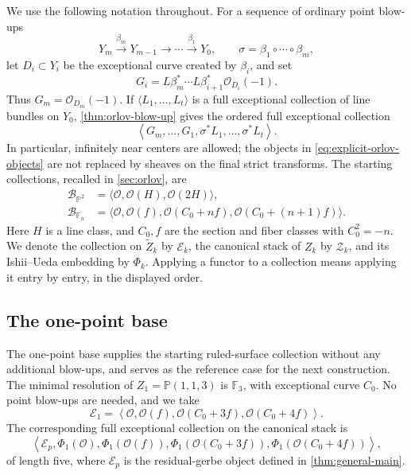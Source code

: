 \documentclass[11pt]{article}
\theoremstyle{plain}
\theoremstyle{definition}
\theoremstyle{remark}
\newcommand{\Pp}{\mathbb P}
\newcommand{\F}{\mathbb F}
\newcommand{\OO}{\mathcal O}
\begin{document}
We use the following notation throughout. For a sequence of ordinary
point blow-ups
\[
Y_m\xrightarrow{\beta_m}Y_{m-1}\longrightarrow\cdots
\xrightarrow{\beta_1}Y_0,
\qquad \sigma=\beta_1\circ\cdots\circ\beta_m,
\]
let \(D_i\subset Y_i\) be the exceptional curve created by \(\beta_i\),
and set
\begin{equation}\label{eq:explicit-orlov-objects}
G_i=L\beta_m^*\cdots L\beta_{i+1}^*\OO_{D_i}(-1).
\end{equation}
Thus \(G_m=\OO_{D_m}(-1)\). If
\(\langle L_1,\ldots,L_t\rangle\) is a full exceptional collection of
line bundles on \(Y_0\), \cref{thm:orlov-blow-up} gives the ordered
full exceptional collection
\begin{equation}\label{eq:explicit-orlov-order}
\left\langle G_m,\ldots,G_1,
\sigma^*L_1,\ldots,\sigma^*L_t\right\rangle.
\end{equation}
In particular, infinitely near centers are allowed; the objects in
\eqref{eq:explicit-orlov-objects} are not replaced by sheaves on the
final strict transforms. The starting collections, recalled in
\cref{sec:orlov}, are
\[
\begin{aligned}
\mathscr B_{\Pp^2}
 &=\langle\OO,\OO(H),\OO(2H)\rangle,\\
\mathscr B_{\F_n}
 &=\langle\OO,\OO(f),\OO(C_0+nf),\OO(C_0+(n+1)f)\rangle.
\end{aligned}
\]
Here \(H\) is a line class, and \(C_0,f\) are the section and fiber
classes with \(C_0^2=-n\). We denote the collection on
\(\widetilde Z_k\) by \(\mathscr E_k\), the canonical stack of
\(Z_k\) by \(\mathcal Z_k\), and its Ishii--Ueda embedding by
\(\Phi_k\). Applying a functor to a collection means applying it
entry by entry, in the displayed order.

\subsection{The one-point base}
\label{app:explicit-base-one}

The one-point base supplies the starting ruled-surface collection without
any additional blow-ups, and serves as the reference case for the next
construction. The minimal resolution of \(Z_1=\Pp(1,1,3)\) is \(\F_3\), with
exceptional curve \(C_0\). No point blow-ups are needed, and we take
\[
\mathscr E_1=
\left\langle\OO,\OO(f),\OO(C_0+3f),\OO(C_0+4f)\right\rangle.
\]
The corresponding full exceptional collection on the canonical stack is
\[
\left\langle
\mathcal E_p,\Phi_1(\OO),\Phi_1(\OO(f)),
\Phi_1(\OO(C_0+3f)),\Phi_1(\OO(C_0+4f))
\right\rangle,
\]
of length five, where \(\mathcal E_p\) is the residual-gerbe object
defined in \cref{thm:general-main}.
\end{document}
